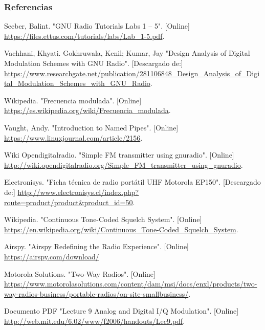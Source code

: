 \begin{frame}[allowframebreaks]
\frametitle{Referencias}



\begin{thebibliography}{9}







 Seeber, Balint.
\newblock "GNU Radio Tutorials Labs 1 – 5". [Online] \url{https://files.ettus.com/tutorials/labs/Lab\_1-5.pdf}. 

 Vachhani, Khyati. Gokhruwala, Kenil; Kumar, Jay  
\newblock "Design Analysis of Digital Modulation Schemes with GNU Radio". [Descargado de:] \url{https://www.researchgate.net/publication/281106848_Design_Analysis_of_Digital_Modulation_Schemes_with_GNU_Radio}. 

 Wikipedia.
\newblock "Frecuencia modulada". [Online] \url{https://es.wikipedia.org/wiki/Frecuencia_modulada}. 

 Vaught, Andy.
\newblock "Introduction to Named Pipes". [Online] \url{https://www.linuxjournal.com/article/2156}. 

 Wiki Opendigitalradio.
\newblock "Simple FM transmitter using gnuradio". [Online] \url{http://wiki.opendigitalradio.org/Simple_FM_transmitter_using_gnuradio}. 


 Electronisys.
\newblock "Ficha técnica de radio portátil UHF Motorola EP150". [Descargado de:] \url{http://www.electronisys.cl/index.php?route=product/product&product\_id=50}. 

 Wikipedia.
\newblock "Continuous Tone-Coded Squelch System". [Online] \url{https://en.wikipedia.org/wiki/Continuous\_Tone-Coded\_Squelch\_System}. 

 Airspy.
\newblock "Airspy Redefining the Radio Experience". [Online] \url{https://airspy.com/download/}

 Motorola Solutions.
\newblock "Two-Way Radios". [Online] \url{https://www.motorolasolutions.com/content/dam/msi/docs/enxl/products/two-way-radios-business/portable-radios/on-site-smallbusiness/}. 

 Documento PDF
\newblock "Lecture 9 Analog and Digital I/Q Modulation". [Online] \url{http://web.mit.edu/6.02/www/f2006/handouts/Lec9.pdf}.





\end{thebibliography}


\end{frame}